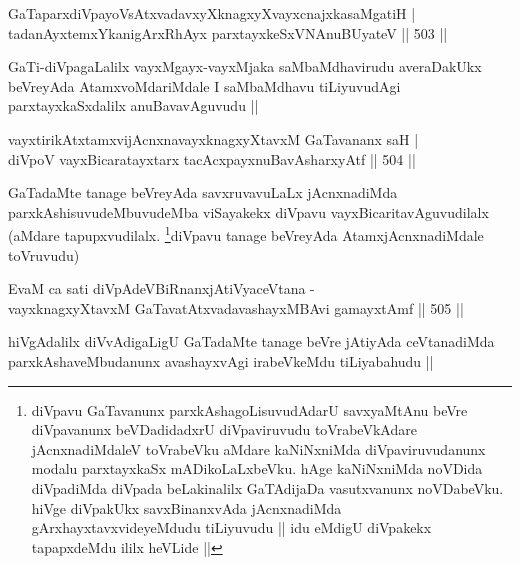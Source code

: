 
\begin{shl}
GaTaparxdiVpayoVsAtxvadavxyXknagxyXvayxcnajxkasaMgatiH | \\
tadanAyxtemxYkanigArxRhAyx parxtayxkeSxVNAnuBUyateV \hfill||  503 ||  
\end{shl}

\begin{artha}
GaTi-diVpagaLalilx vayxMgayx-vayxMjaka saMbaMdhavirudu averaDakUkx beVreyAda AtamxvoMdariMdale I saMbaMdhavu tiLiyuvudAgi parxtayxkaSxdalilx anuBavavAguvudu ||
\end{artha}

\begin{shl}
vayxtirikAtxtamxvijAcnxnavayxknagxyXtavxM GaTavananx saH | \\
diVpoV vayxBicaratayxtarx tacAcxpayxnuBavAsharxyAtf \hfill||  504 ||  
\end{shl}

\begin{artha}
GaTadaMte tanage beVreyAda savxruvavuLaLx jAcnxnadiMda parxkAshisuvudeMbuvudeMba viSayakekx diVpavu vayxBicaritavAguvudilalx (aMdare tapupxvudilalx. \footnote{diVpavu GaTavanunx parxkAshagoLisuvudAdarU savxyaMtAnu beVre diVpavanunx beVDadidadxrU diVpaviruvudu toVrabeVkAdare jAcnxnadiMdaleV toVrabeVku aMdare kaNiNxniMda diVpaviruvudanunx modalu parxtayxkaSx mADikoLaLxbeVku. hAge kaNiNxniMda noVDida diVpadiMda diVpada beLakinalilx GaTAdijaDa vasutxvanunx noVDabeVku. hiVge diVpakUkx savxBinanxvAda jAcnxnadiMda gArxhayxtavxvideyeMdudu tiLiyuvudu || idu eMdigU diVpakekx tapapxdeMdu ililx heVLide ||}diVpavu tanage beVreyAda AtamxjAcnxnadiMdale toVruvudu)
\end{artha}


\begin{shl}
EvaM ca sati diVpAdeVBiRnanxjAtiVyaceVtana -\\
vayxknagxyXtavxM GaTavatAtxvadavashayxMBAvi gamayxtAmf \hfill||  505 ||  
\end{shl}

\begin{artha}
hiVgAdalilx diVvAdigaLigU GaTadaMte tanage beVre jAtiyAda ceVtanadiMda parxkAshaveMbudanunx avashayxvAgi irabeVkeMdu tiLiyabahudu ||
\end{artha}



